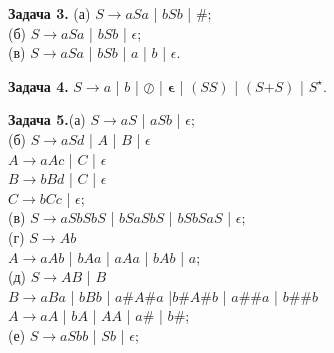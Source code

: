 \documentclass{article}
\newcommand{\bleft}{
    \boldsymbol{\left(\right.}
}
\newcommand{\bright}{
    \boldsymbol{\left.\right)}
}
\newcommand{\bplus}{
    \boldsymbol{+}
}
\newcommand{\bepsilon}{
    \boldsymbol{\epsilon}
}
\begin{document}
    \vspace{50pt}

    \textbf{Задача 3.} (а) $S \rightarrow aSa$ | $bSb$ | $\#$; \\
    (б) $S \rightarrow aSa$ | $bSb$ | $\epsilon$; \\
    (в) $S \rightarrow aSa$ | $bSb$ | $a$ | $b$ | $\epsilon$.

    \vspace{15pt}

    \textbf{Задача 4.} $S \rightarrow a$ | $b$ | $\oslash$ | $\bepsilon$ | $\bleft SS \bright$ | $\bleft S \bplus S \bright$ | $S^\star$.

    \vspace{15pt}

    \textbf{Задача 5.}(а) $S \rightarrow aS$ | $aSb$ | $\epsilon$; \\
    \vspace{5pt}
    (б) $S \rightarrow aSd$ | $A$ | $B$ | $\epsilon$ \\
    $A \rightarrow aAc$ | $C$ | $\epsilon$ \\
    $B \rightarrow bBd$ | $C$ | $\epsilon$ \\
    $C \rightarrow bCc$ | $\epsilon$; \\
    \vspace{5pt}
    (в) $S \rightarrow aSbSbS$ | $bSaSbS$ | $bSbSaS$ | $\epsilon$; \\
    \vspace{5pt}
    (г) $S \rightarrow Ab$ \\
    $A \rightarrow aAb$ | $bAa$ | $aAa$ | $bAb$ | $a$; \\
    \vspace{5pt}
    (д) $S \rightarrow AB$ | $B$ \\
    $B \rightarrow aBa$ | $bBb$ | $a\#A\#a$ |$b\#A\#b$ | $a\#\#a$ | $b\#\#b$ \\
    $A \rightarrow aA$ | $bA$ | $AA$ | $a\#$ | $b\#$; \\
    \vspace{5pt}
    (е) $S \rightarrow aSbb$ | $Sb$ | $\epsilon$;
\end{document}
